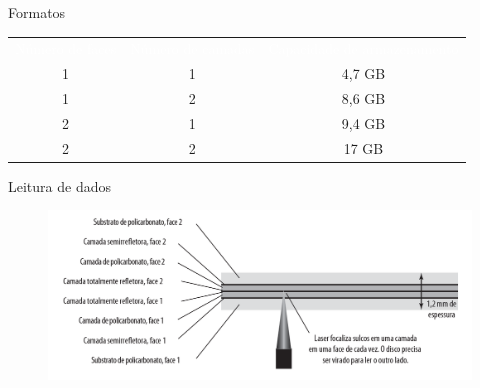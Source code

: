 \documentclass[aspectratio=169,
				xcolor=table]{beamer}
\begin{document}
	\begin{frame}{Formatos}
		\begin{eftable}
			\centering
			\begin{tabular}{c|c|c}
				\textcolor{white}{Número de faces} & 
				\textcolor{white}{Número de camadas} & 
				\textcolor{white}{Capacidade de armazenamento} \\ 
				1 & 1 & 4,7 GB \\ 
				1 & 2 & 8,6 GB \\ 
				2 & 1 & 9,4 GB \\ 
				2 & 2 & 17 GB \\ 
			\end{tabular} 
		
		\end{eftable}
	\end{frame}

	\begin{frame}{Leitura de dados}
		\begin{figure}[hbtp]
			\centering
			\includegraphics[width=\textwidth, keepaspectratio]{../figs/cap08/dvd}
		\end{figure}			
	\end{frame}
	
\end{document}
